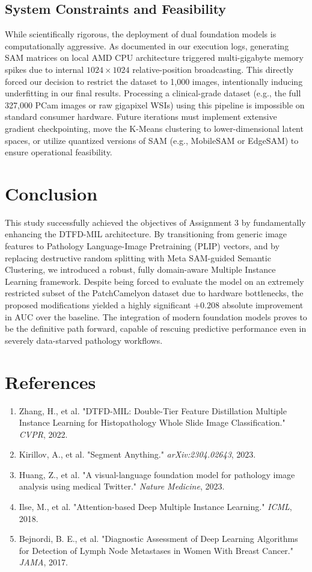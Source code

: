 \documentclass[12pt, a4paper]{article}
\begin{document}
\subsection{System Constraints and Feasibility}
While scientifically rigorous, the deployment of dual foundation models is computationally aggressive. As documented in our execution logs, generating SAM matrices on local AMD CPU architecture triggered multi-gigabyte memory spikes due to internal $1024 \times 1024$ relative-position broadcasting. This directly forced our decision to restrict the dataset to 1,000 images, intentionally inducing underfitting in our final results. Processing a clinical-grade dataset (e.g., the full 327,000 PCam images or raw gigapixel WSIs) using this pipeline is impossible on standard consumer hardware. Future iterations must implement extensive gradient checkpointing, move the K-Means clustering to lower-dimensional latent spaces, or utilize quantized versions of SAM (e.g., MobileSAM or EdgeSAM) to ensure operational feasibility.

\section{Conclusion}
This study successfully achieved the objectives of Assignment 3 by fundamentally enhancing the DTFD-MIL architecture. By transitioning from generic image features to Pathology Language-Image Pretraining (PLIP) vectors, and by replacing destructive random splitting with Meta SAM-guided Semantic Clustering, we introduced a robust, fully domain-aware Multiple Instance Learning framework. Despite being forced to evaluate the model on an extremely restricted subset of the PatchCamelyon dataset due to hardware bottlenecks, the proposed modifications yielded a highly significant $+0.208$ absolute improvement in AUC over the baseline. The integration of modern foundation models proves to be the definitive path forward, capable of rescuing predictive performance even in severely data-starved pathology workflows.

\section{References}
\begin{enumerate}
    \item Zhang, H., et al. "DTFD-MIL: Double-Tier Feature Distillation Multiple Instance Learning for Histopathology Whole Slide Image Classification." \textit{CVPR}, 2022.
    \item Kirillov, A., et al. "Segment Anything." \textit{arXiv:2304.02643}, 2023.
    \item Huang, Z., et al. "A visual-language foundation model for pathology image analysis using medical Twitter." \textit{Nature Medicine}, 2023.
    \item Ilse, M., et al. "Attention-based Deep Multiple Instance Learning." \textit{ICML}, 2018.
    \item Bejnordi, B. E., et al. "Diagnostic Assessment of Deep Learning Algorithms for Detection of Lymph Node Metastases in Women With Breast Cancer." \textit{JAMA}, 2017.
\end{enumerate}
\end{document}
